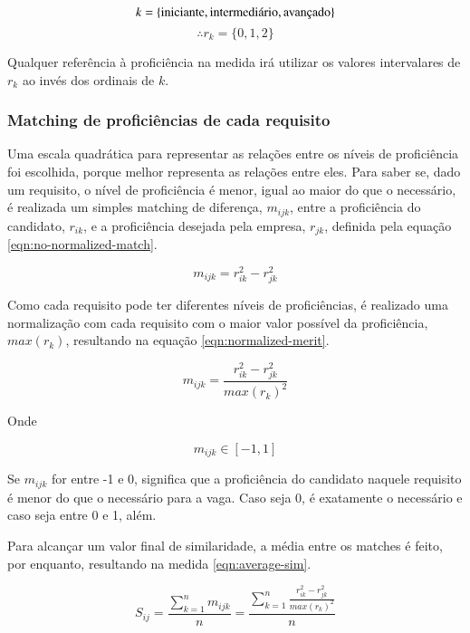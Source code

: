 \documentclass[preprint,12pt]{elsarticle}
\begin{document}
$$\\k = \{ \text{iniciante}, \text{intermediário}, \text{avançado} \}$$ 
$$ \therefore r_k = \{ 0, 1, 2 \} $$

Qualquer referência à proficiência na medida irá utilizar os valores intervalares de $r_k$ ao invés dos ordinais de $k$.

\subsubsection{Matching de proficiências de cada requisito}
\label{sssec:matching}
Uma escala quadrática para representar as relações entre os níveis de proficiência foi escolhida, porque melhor representa as relações entre eles. Para saber se, dado um requisito, o nível de proficiência é menor, igual ao maior do que o necessário, é realizada um simples matching de diferença, $m_{ijk}$, entre a proficiência do candidato, $r_{ik}$, e a proficiência desejada pela empresa, $r_{jk}$, definida pela equação \ref{eqn:no-normalized-match}.
    
\begin{equation}
\label{eqn:no-normalized-match}
   m_{ijk} = r_{ik}^2 - r_{jk}^2
\end{equation}

Como cada requisito pode ter diferentes níveis de proficiências, é realizado uma normalização com cada requisito com o maior valor possível da proficiência, $max(r_k)$, resultando na equação \ref{eqn:normalized-merit}.
    
\begin{equation}
\label{eqn:normalized-merit}
m_{ijk} = \frac{r_{ik}^2 - r_{jk}^2}{max(r_k)^2}
\end{equation}

Onde

\begin{equation}
m_{ijk} \in [-1, 1]
\end{equation}

Se $m_{ijk}$ for entre -1 e 0, significa que a proficiência do candidato naquele requisito é menor do que o necessário para a vaga. Caso seja 0, é exatamente o necessário e caso seja entre 0 e 1, além.

Para alcançar um valor final de similaridade, a média entre os matches é feito, por enquanto, resultando na medida \ref{eqn:average-sim}.

\begin{equation}
\label{eqn:average-sim}
S_{ij} =  \frac{\sum_{k=1}^n m_{ijk}}
              {n} = 
          \frac{\sum_{k=1}^n \frac{r_{ik}^2 - r_{jk}^2}{max(r_k)^2}}
              {n}
\end{equation}
\end{document}
